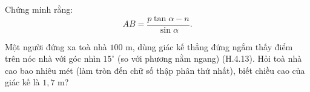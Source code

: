\begin{practice}
\begin{questions}[resume=SBT]
        Chứng minh rằng:
        \[
            AB=\dfrac{p\tan\alpha-n}{\sin\alpha}.
        \]

        \answerline
        \answerline
        \answerline
        \answerline

        \item Một người đứng xa toà nhà $100$ m, dùng giác kế thẳng đứng ngắm thấy điểm trên nóc nhà với góc nhìn $15^\circ$ (so với phương nằm ngang) (H.4.13). Hỏi toà nhà cao bao nhiêu mét (làm tròn đến chữ số thập phân thứ nhất), biết chiều cao của giác kế là $1{,}7$ m?

        \answerline
        \answerline
        \answerline
    \end{questions}
\end{practice}
